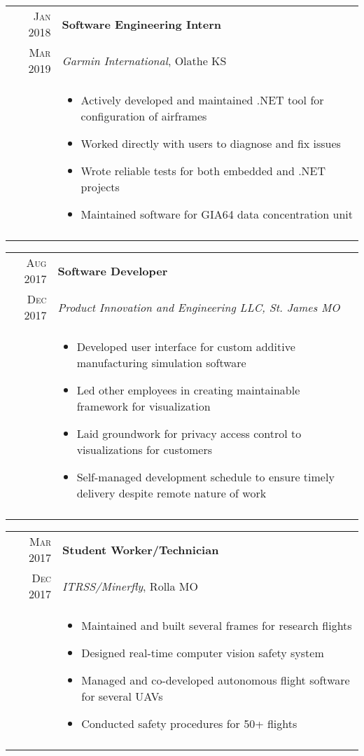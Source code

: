 \documentclass[a4paper,10pt]{article}
\newcommand{\br}{\\\multicolumn{2}{c}{}}
\begin{document}
\begin{tabular}{r|p{15cm}}
    \textsc{Jan 2018} & \textbf{Software Engineering Intern} \\
    \textsc{Mar 2019} & \textit{Garmin International}, Olathe KS \\ &
    \begin{itemize}
    \item Actively developed and maintained .NET tool for configuration of airframes
    \item Worked directly with users to diagnose and fix issues
    \item Wrote reliable tests for both embedded and .NET projects
    \item Maintained software for GIA64 data concentration unit

    \end{itemize} \br\\

\end{tabular}

\begin{tabular}{r|p{15cm}}
    \textsc{Aug 2017} & \textbf{Software Developer} \\
    \textsc{Dec 2017} & \textit{Product Innovation and Engineering LLC, St. James MO} \\ &
    \begin{itemize}
    \item Developed user interface for custom additive manufacturing simulation software
    \item Led other employees in creating maintainable framework for visualization
    \item Laid groundwork for privacy access control to visualizations for customers
    \item Self-managed development schedule to ensure timely delivery despite remote nature of work

    \end{itemize} \br\\

\end{tabular}

\begin{tabular}{r|p{15cm}}
    \textsc{Mar 2017} & \textbf{Student Worker/Technician} \\
    \textsc{Dec 2017} & \textit{ITRSS/Minerfly}, Rolla MO \\ &
    \begin{itemize}
    \item Maintained and built several frames for research flights
    \item Designed real-time computer vision safety system
    \item Managed and co-developed autonomous flight software for several UAVs
    \item Conducted safety procedures for 50+ flights

    \end{itemize} \br\\

\end{tabular}
\end{document}

